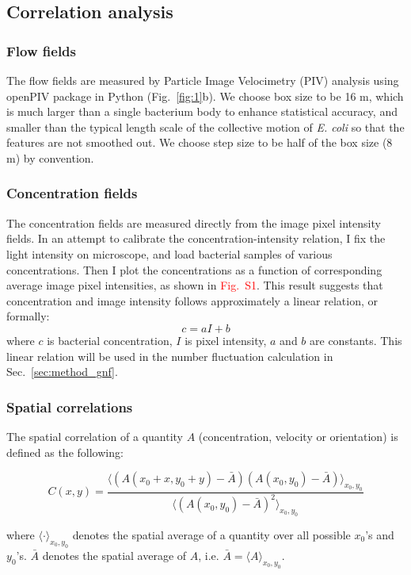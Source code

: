 \documentclass[twocolumn,aps,pre,amsmath,amssymb,floatfix,longbibliography]{revtex4-1}
\begin{document}
\subsection{Correlation analysis}

\subsubsection{Flow fields}
The flow fields are measured by Particle Image Velocimetry (PIV) analysis using openPIV package in Python \cite{openpiv} (Fig.~\ref{fig:1}b). We choose box size to be 16 \textmu m, which is much larger than a single bacterium body to enhance statistical accuracy, and smaller than the typical length scale of the collective motion of \textit{E. coli} so that the features are not smoothed out. We choose step size to be half of the box size (8 \textmu m) by convention.

\subsubsection{Concentration fields}
The concentration fields are measured directly from the image pixel intensity fields. In an attempt to calibrate the concentration-intensity relation, I fix the light intensity on microscope, and load bacterial samples of various concentrations. Then I plot the concentrations as a function of corresponding average image pixel intensities, as shown in \textcolor{red}{Fig.~S1}. This result suggests that concentration and image intensity follows approximately a linear relation, or formally:
$$ c = aI + b $$
where $c$ is bacterial concentration, $I$ is pixel intensity, $a$ and $b$ are constants. This linear relation will be used in the number fluctuation calculation in Sec.~\ref{sec:method_gnf}.
\subsubsection{Spatial correlations}

The spatial correlation of a quantity $A$ (concentration, velocity or orientation) is defined as the following:

$$ C(x, y) = \frac{\langle(A(x_0+x, y_0+y)-\bar A)(A(x_0, y_0)-\bar A) \rangle_{x_0, y_0}}{\langle(A(x_0, y_0)-\bar A)^2\rangle_{x_0, y_0}}$$

where $\langle\cdot\rangle_{x_0, y_0}$ denotes the spatial average of a quantity over all possible $x_0$'s and $y_0$'s.  $\bar A$ denotes the spatial average of $A$, i.e. $\bar A=\langle A\rangle_{x_0, y_0}$.
\end{document}
